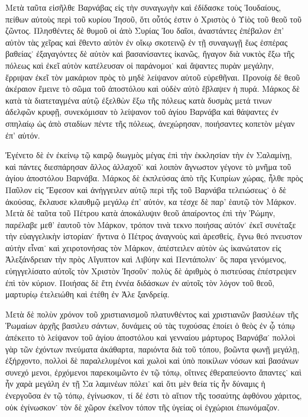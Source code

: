 Μετὰ ταῦτα εἰσῆλθε Βαρνάβας εἰς τὴν συναγωγὴν καὶ
ἐδίδασκε τοὺς Ἰουδαίους, πείθων αὐτοὺς περὶ τοῦ κυρίου
Ἰησοῦ, ὅτι οὗτός ἐστιν ὁ Χριστὸς ὁ Υἱὸς τοῦ θεοῦ
τοῦ ζῶντος. Πλησθέντες δὲ θυμοῦ οἱ ἀπὸ Συρίας Ἰου%
δαῖοι, ἀναστάντες ἐπέβαλον ἐπ’ αὐτὸν τὰς χεῖρας καὶ
ἔθεντο αὐτὸν ἐν οἴκῳ σκοτεινῷ ἐν τῇ συναγωγῇ ἕως
ἑσπέρας βαθείας˙ ἐξαγαγόντες δὲ αὐτὸν καὶ βασανίσαντες
ἱκανῶς, ἤγαγον διὰ νυκτὸς ἔξω τῆς πόλεως καὶ ἐκεῖ
αὐτὸν κατέλευσαν οἱ παράνομοι˙ καὶ ἅψαντες πυρὰν
μεγάλην, ἔρριψαν ἐκεῖ τὸν μακάριον πρὸς τὸ μηδὲ
λείψανον αὐτοῦ εὑρεθῆναι. Προνοίᾳ δὲ θεοῦ ἀκέραιον
ἔμεινε τὸ σῶμα τοῦ ἀποστόλου καὶ οὐδὲν αὐτὸ ἔβλαψεν
ἡ πυρά. Μάρκος δὲ κατὰ τὰ διατεταγμένα αὐτῷ ἐξελθὼν
ἔξω τῆς πόλεως κατὰ δυσμὰς μετά τινων ἀδελφῶν
κρυφῇ, συνεκόμισαν τὸ λείψανον τοῦ ἁγίου Βαρνάβα καὶ
θάψαντες ἐν σπηλαίῳ ὡς ἀπὸ σταδίων πέντε τῆς πόλεως,
ἀνεχώρησαν, ποιήσαντες κοπετὸν μέγαν ἐπ’ αὐτόν.

Ἐγένετο δὲ ἐν ἐκείνῳ τῷ καιρῷ διωγμὸς μέγας ἐπὶ
τὴν ἐκκλησίαν τὴν ἐν Σαλαμίνῃ, καὶ πάντες διεσπάρησαν
ἄλλος ἀλλαχοῦ˙ καὶ λοιπὸν ἄγνωστον γέγονε τὸ μνῆμα
τοῦ ἁγίου ἀποστόλου Βαρνάβα. Μάρκος δὲ ἐκπλεύσας
ἀπὸ τῆς Κυπρίων χώρας, ἦλθε πρὸς Παῦλον εἰς Ἔφεσον
καὶ ἀνήγγειλεν αὐτῷ περὶ τῆς τοῦ Βαρνάβα τελειώσεως˙
ὁ δὲ ἀκούσας, ἔκλαυσε κλαυθμῷ μεγάλῳ ἐπ’ αὐτόν, κα%
τέσχε δὲ παρ’ ἑαυτῷ τὸν Μάρκον. Μετὰ δὲ ταῦτα τοῦ
Πέτρου κατὰ ἀποκάλυψιν θεοῦ ἀπαίροντος ἐπὶ τὴν Ῥώμην,
παρέλαβε μεθ’ ἑαυτοῦ τὸν Μάρκον, τρόπον τινὰ τεκνο%
ποιήσας αὐτόν˙ ἐκεῖ συνέταξε τὴν εὐαγγελικὴν ἱστορίαν˙
ἥντινα ὁ Πέτρος ἀναγνοὺς καὶ ἀρεσθείς, ἔγνω θεό%
πνευστον αὐτὴν εἶναι˙ καὶ χειροτονήσας τὸν Μάρκον,
ἀπέστειλεν αὐτὸν ὡς ἱκανώτατον εἰς Ἀλεξάνδρειαν τὴν
πρὸς Αἴγυπτον καὶ Λιβύην καὶ Πεντάπολιν˙ ὃς παρα%
γενόμενος, εὐηγγελίσατο αὐτοῖς τὸν Χριστὸν Ἰησοῦν˙
πολὺς δὲ ἀριθμὸς ὁ πιστεύσας ἐπέστρεψεν ἐπὶ τὸν
κύριον. Ποιήσας δὲ ἔτη ἐννέα διδάσκων ἐν αὐτοῖς τὸν
λόγον τοῦ θεοῦ, μαρτυρίῳ ἐτελειώθη καὶ ἐτέθη ἐν Ἀλε%
ξανδρείᾳ.
 




\saut

Μετὰ δὲ πολὺν χρόνον τοῦ χριστιανισμοῦ πλατυνθέντος
καὶ χριστιανῶν βασιλέων τῆς Ῥωμαίων ἀρχῆς βασιλευ%
σάντων, δυνάμεις οὐ τὰς τυχούσας ἐποίει ὁ θεὸς ἐν
ᾧ τόπῳ ἀπέκειτο τὸ λείψανον τοῦ ἁγίου ἀποστόλου καὶ
γενναίου μάρτυρος Βαρνάβα˙ πολλοὶ γὰρ τῶν ἐχόντων
πνεύματα ἀκάθαρτα, παριόντα διὰ τοῦ τόπου, βοῶντα
φωνῇ μεγάλῃ, ἐξήρχοντο, πολλοὶ δὲ παραλελυμένοι καὶ
χωλοὶ καὶ ὑπὸ ποικίλων νόσων καὶ βασάνων συνεχό%
μενοι, ἐρχόμενοι παρεκοιμῶντο ἐν τῷ τόπῳ, οἵτινες
ἐθεραπεύοντο ἅπαντες˙ καὶ ἦν χαρὰ μεγάλη ἐν τῇ Σα%
λαμινέων πόλει˙ καὶ ὅτι μὲν θεία τίς ἦν δύναμις ἡ
ἐνεργοῦσα ἐν τῷ τόπῳ, ἐγίνωσκον, τί δέ ἐστι τὸ αἴτιον
τῆς τοσαύτης ἀφθόνου χάριτος, οὐκ ἐγίνωσκον˙ τὸν δὲ
χῶρον ἐκεῖνον τόπον τῆς ὑγείας οἱ ἐγχώριοι ἐπωνόμαζον.

